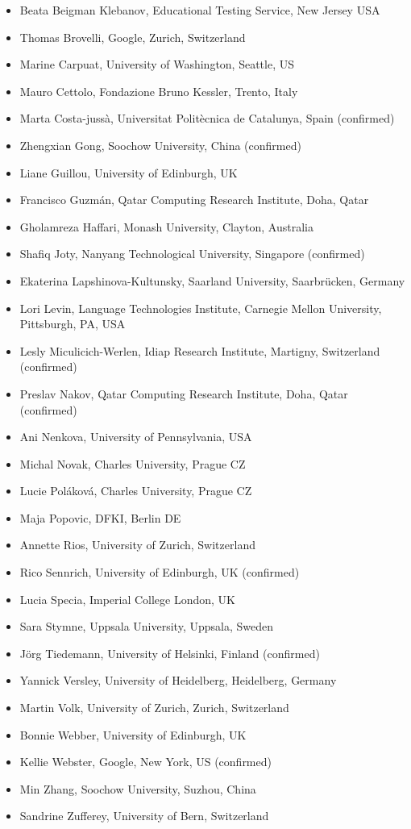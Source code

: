 \documentclass[11pt]{article}
\begin{document}
\begin{itemize}
\item Beata Beigman Klebanov, Educational Testing Service, New Jersey USA
\item Thomas Brovelli, Google, Zurich, Switzerland
\item Marine Carpuat, University of Washington, Seattle, US
\item Mauro Cettolo, Fondazione Bruno Kessler, Trento, Italy
\item Marta Costa-jussà, Universitat Politècnica de Catalunya, Spain (confirmed)
\item Zhengxian Gong, Soochow University, China (confirmed)
\item Liane Guillou, University of Edinburgh, UK
\item Francisco Guzm\'{a}n, Qatar Computing Research Institute, Doha, Qatar
\item Gholamreza Haffari, Monash University, Clayton, Australia
\item Shafiq Joty, Nanyang Technological University, Singapore (confirmed)
\item Ekaterina Lapshinova-Kultunsky, Saarland University, Saarbrücken, Germany 
\item Lori Levin, Language Technologies Institute, Carnegie Mellon University, Pittsburgh, PA, USA
\item Lesly Miculicich-Werlen, Idiap Research Institute, Martigny, Switzerland (confirmed)
\item Preslav Nakov, Qatar Computing Research Institute, Doha, Qatar (confirmed)
\item Ani Nenkova, University of Pennsylvania, USA
\item Michal Novak, Charles University, Prague CZ
\item Lucie Pol\'{a}kov\'{a}, Charles University, Prague CZ
\item Maja Popovic, DFKI, Berlin DE
\item Annette Rios, University of Zurich, Switzerland
\item Rico Sennrich, University of Edinburgh, UK (confirmed)
\item Lucia Specia, Imperial College London, UK
\item Sara Stymne, Uppsala University, Uppsala, Sweden
\item Jörg Tiedemann, University of Helsinki, Finland (confirmed)
\item Yannick Versley, University of Heidelberg, Heidelberg, Germany
\item Martin Volk, University of Zurich, Zurich, Switzerland
\item Bonnie Webber, University of Edinburgh, UK
\item Kellie Webster, Google, New York, US (confirmed)
\item Min Zhang, Soochow University, Suzhou, China
\item Sandrine Zufferey, University of Bern, Switzerland
\end{itemize}
\end{document}
